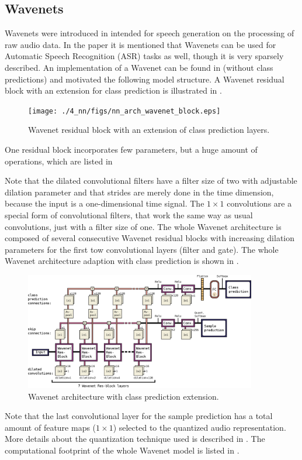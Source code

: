 \subsection{Wavenets}\label{sec:nn_arch_wavenet}
Wavenets were introduced in \cite{Oord2016} intended for speech generation on the processing of raw audio data.
In the paper it is mentioned that Wavenets can be used for Automatic Speech Recognition (ASR) tasks as well, though it is very sparsely described.
An implementation of a Wavenet can be found in \cite{Herrmann2018} (without class predictions) and motivated the following model structure.
A Wavenet residual block with an extension for class prediction is illustrated in .
\begin{figure}[!ht]
  \centering
    \texttt{[image: ./4\_nn/figs/nn\_arch\_wavenet\_block.eps]}
  \caption{Wavenet residual block \cite{Oord2016} with an extension of class prediction layers.}
  \label{fig:nn_arch_wavenet_block}
\end{figure}
\FloatBarrier
\noindent
One residual block incorporates few parameters, but a huge amount of operations, which are listed in 

Note that the dilated convolutional filters have a filter size of two with adjustable dilation parameter and that strides are merely done in the time dimension, because the input is a one-dimensional time signal.
The $1 \times 1$ convolutions are a special form of convolutional filters, that work the same way as usual convolutions, just with a filter size of one. 
The whole Wavenet architecture is composed of several consecutive Wavenet residual blocks with increasing dilation parameters for the first tow convolutional layers (filter and gate).
The whole Wavenet architecture adaption with class prediction is shown in .
\begin{figure}[!ht]
  \centering
    \includegraphics[width=0.9\textwidth]{./4_nn/figs/nn_arch_wavenet_all.eps}
  \caption{Wavenet architecture with class prediction extension.}
  \label{fig:nn_arch_wavenet_all}
\end{figure}
\FloatBarrier
\noindent
Note that the last convolutional layer for the sample prediction has a total amount of feature maps ($1 \times 1$) selected to the quantized audio representation.
More details about the quantization technique used is described in \cite{Oord2016}.
The computational footprint of the whole Wavenet model is listed in .


